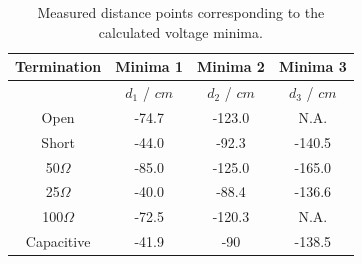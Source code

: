 \begin{table}[ht!]
	\centering
	\begin{tabular}{|c|c|c|c|}
		\hline
		\textbf{Termination} & \textbf{Minima 1} & \textbf{Minima 2} & \textbf{Minima 3} \\
		\hline
		& $d_1$ / $cm$ & $d_2$ / $cm$ & $d_3$ / $cm$ \\
		\hline\hline
		Open        & -74.7 & -123.0 	& N.A. 	\\
		Short       & -44.0 & -92.3 	& -140.5 \\
		50$\Omega$  & -85.0 & -125.0	& -165.0 \\
		25$\Omega$  & -40.0 & -88.4   	& -136.6	\\
		100$\Omega$ & -72.5 & -120.3  	& N.A. 	\\
		Capacitive  & -41.9 & -90  		& -138.5	\\
		\hline
	\end{tabular}
	\caption{\centering Measured distance points corresponding to the calculated voltage minima.}
	\label{tab:minimas}
\end{table}
